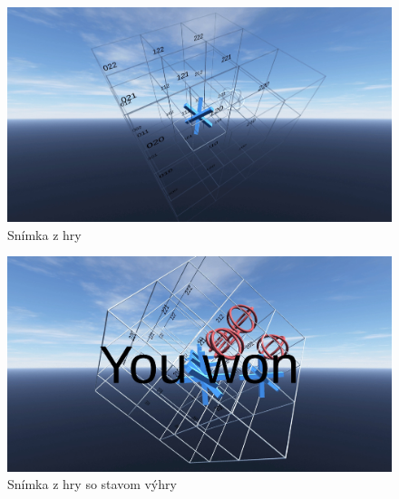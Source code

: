 \begin{figure}[H]
    \centering
    \includegraphics[width=1\textwidth]{images/screenshot-game-2.jpg}
    \caption{Snímka z hry}
\end{figure}

\begin{figure}[H]
    \centering
    \includegraphics[width=1\textwidth]{images/screenshot-win.jpg}
    \caption{Snímka z hry so stavom výhry}
\end{figure}

\clearpage
